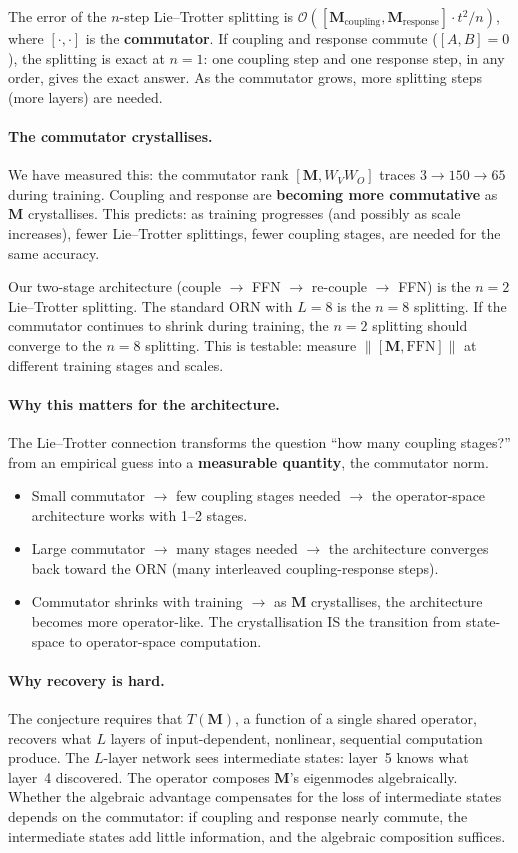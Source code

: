 \documentclass[11pt, a4paper]{article}
\newcommand{\M}{\mathbf{M}}
\newcommand{\norm}[1]{\left\| #1 \right\|}
\newcommand{\bigO}{\mathcal{O}}
\theoremstyle{plain}
\theoremstyle{definition}
\theoremstyle{remark}
\begin{document}
The error of the $n$-step Lie--Trotter splitting is $\bigO([\M_{\mathrm{coupling}}, \M_{\mathrm{response}}] \cdot t^2 / n)$, where $[\cdot, \cdot]$ is the \textbf{commutator}.
If coupling and response commute ($[A, B] = 0$), the splitting is exact at $n = 1$: one coupling step and one response step, in any order, gives the exact answer.
As the commutator grows, more splitting steps (more layers) are needed.

\paragraph{The commutator crystallises.}
We have measured this: the commutator rank $[\M, W_V W_O]$ traces $3 \to 150 \to 65$ during training.
Coupling and response are \textbf{becoming more commutative} as $\M$ crystallises.
This predicts: as training progresses (and possibly as scale increases), fewer Lie--Trotter splittings, fewer coupling stages, are needed for the same accuracy.

Our two-stage architecture (couple $\to$ FFN $\to$ re-couple $\to$ FFN) is the $n = 2$ Lie--Trotter splitting.
The standard ORN with $L = 8$ is the $n = 8$ splitting.
If the commutator continues to shrink during training, the $n = 2$ splitting should converge to the $n = 8$ splitting.
This is testable: measure $\norm{[\M, \mathrm{FFN}]}$ at different training stages and scales.

\paragraph{Why this matters for the architecture.}
The Lie--Trotter connection transforms the question ``how many coupling stages?'' from an empirical guess into a \textbf{measurable quantity}, the commutator norm.
\begin{itemize}[nosep]
\item Small commutator $\to$ few coupling stages needed $\to$ the operator-space architecture works with 1--2 stages.
\item Large commutator $\to$ many stages needed $\to$ the architecture converges back toward the ORN (many interleaved coupling-response steps).
\item Commutator shrinks with training $\to$ as $\M$ crystallises, the architecture becomes more operator-like. The crystallisation IS the transition from state-space to operator-space computation.
\end{itemize}

\paragraph{Why recovery is hard.}
The conjecture requires that $T(\M)$, a function of a single shared operator, recovers what $L$ layers of input-dependent, nonlinear, sequential computation produce.
The $L$-layer network sees intermediate states: layer~5 knows what layer~4 discovered.
The operator composes $\M$'s eigenmodes algebraically.
Whether the algebraic advantage compensates for the loss of intermediate states depends on the commutator: if coupling and response nearly commute, the intermediate states add little information, and the algebraic composition suffices.
\end{document}
